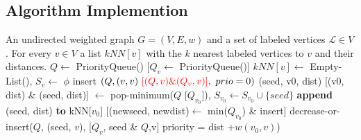\documentclass[a0,landscape]{a0poster}
\begin{document}
\begin{multicols}{4}
\section*{Algorithm Implemention}
\begin{algorithm}[H]
\begin{algorithmic}
   An undirected weighted graph $G = (V,E,w)$ and a set of labeled vertices $\mathcal{L}\in V$.
   For every $v \in V$ a list $kNN[v]$ with the $k$ nearest labeled vertices to $v$ and their distances.
  \STATE $Q\leftarrow$ PriorityQueue()
   \STATE \color{red}[$Q_v\leftarrow$ PriorityQueue()]
   \STATE \color{black}$kNN[v]\leftarrow$ Empty-List(), $S_v\leftarrow$ $\phi$
   \STATE insert $(Q, (v, v) ~\color{red}[(Q, v) \& (Q_v, v)], \color{black}~prio = 0)$ 
   \ENDIF
   \ENDFOR
   \STATE (seed, v0, dist) \color{red}[(v0, dist) \& (seed, dist)] \color{black}$\leftarrow$ pop-minimum($Q$ \color{red}[$Q_{v_0}$]\color{black}), $S_{v_0}\leftarrow S_{v_0}\cup\{seed\}$
  \STATE \textbf{append} (seed, dist) \textbf{to} kNN[$v_0$]
  \STATE \color{red}[(newseed, newdist)$\leftarrow$ min($Q_{v_0}$) \& insert]
  \ENDIF
  \STATE decrease-or-insert($Q$, (seed, $v$), \color{red}[$Q_v$, seed \& $Q$,v] \color{black} priority = dist +$w(v_0, v)$)
  \ENDIF
  \ENDFOR
\ENDWHILE

\end{algorithmic}
 \caption{Computation of Geodesic KNN {\color{red}[with faster priority queue handling]}}
\end{algorithm}



\end{multicols}
\end{document}
